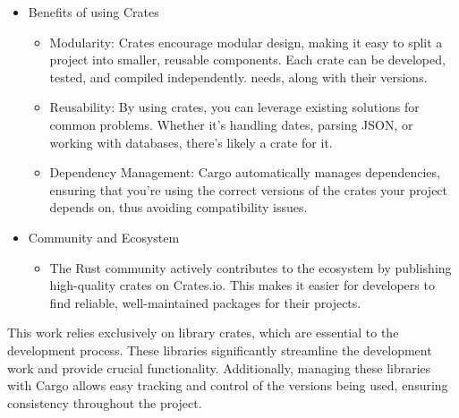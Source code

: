 \begin{itemize}
	\item Benefits of using Crates
	\begin{itemize}
		\item Modularity: Crates encourage modular design, making it easy to split a project into smaller, reusable components. Each crate can be developed, tested, and compiled independently. needs, along with their versions.
		\item Reusability: By using crates, you can leverage existing solutions for common problems. Whether it's handling dates, parsing JSON, or working with databases, there’s likely a crate for it.
		\item Dependency Management: Cargo automatically manages dependencies, ensuring that you’re using the correct versions of the crates your project depends on, thus avoiding compatibility issues.
	\end{itemize}
	
	\item Community and Ecosystem
	\begin{itemize}
		\item The Rust community actively contributes to the ecosystem by publishing high-quality crates on Crates.io. This makes it easier for developers to find reliable, well-maintained packages for their projects.
	\end{itemize}
\end{itemize}


This work relies exclusively on library crates, which are essential to the development process. These libraries significantly streamline the development work and provide crucial functionality. Additionally, managing these libraries with Cargo allows easy tracking and control of the versions being used, ensuring consistency throughout the project.


